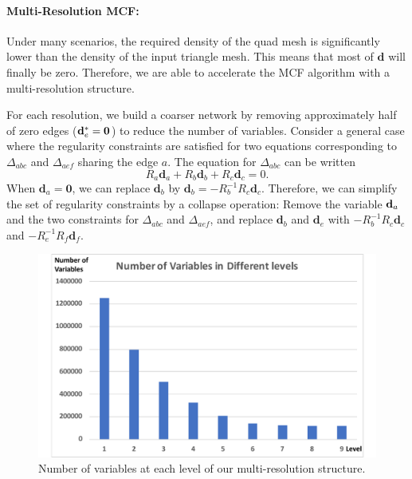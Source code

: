 
\paragraph*{Multi-Resolution MCF:}
Under many scenarios, the required density of the quad mesh is significantly lower than the density of the input triangle mesh. This means that most of ${\textbf{d}}$ will finally be zero. Therefore, we are able to accelerate the MCF algorithm with a multi-resolution structure.

For each resolution, we build a coarser network by removing approximately half of zero edges (${\mathbf{d}}^*_e=\textbf{0}$) to reduce the number of variables.  Consider a general case where the regularity constraints are satisfied for two equations corresponding to $\Delta_{abc}$ and $\Delta_{aef}$ sharing the edge $a$. The equation for $\Delta_{abc}$ can be written
\begin{equation*}
R_a {\textbf{d}}_a + R_b {\textbf{d}}_b + R_c {\textbf{d}}_c = 0.
\end{equation*}
When ${\textbf{d}}_a=\textbf{0}$, we can replace ${\textbf{d}}_b$ by ${\textbf{d}}_b=-R_b^{-1}R_c{\textbf{d}}_c$. Therefore, we can simplify the set of regularity constraints by a collapse operation: Remove the variable ${\mathbf{d}}_a$ and the two constraints for $\Delta_{abc}$ and $\Delta_{aef}$, and replace ${\textbf{d}}_b$ and ${\textbf{d}}_e$ with $-R_b^{-1}R_c{\textbf{d}}_c$ and $-R_e^{-1}R_f{\textbf{d}}_f$.

\begin{figure}
\centering
\includegraphics[width=0.6\linewidth]{quadriflow/diagram/hierarchy.pdf}
\caption{Number of variables at each level of our multi-resolution structure.}
\label{fig:quad-hierarchy}
\end{figure}

